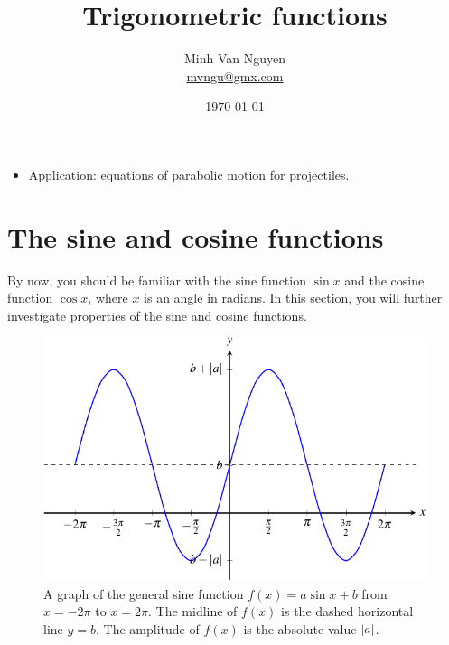 \documentclass[a4paper,oneside,12pt]{article}
\begin{document}
\title{\Large\bf Trigonometric functions}
\author{%
  Minh Van Nguyen \\
  \url{mvngu@gmx.com}
}
\date{\today}
\maketitle

\begin{itemize}
\item Application: equations of parabolic motion for projectiles.
\end{itemize}



\section{The sine and cosine functions}

By now, you should be familiar with the sine function $\sin x$ and the
cosine function $\cos x$, where $x$ is an angle in radians.  In this
section, you will further investigate properties of the sine and
cosine functions.

\begin{figure}[!htbp]
\centering
\includegraphics[scale=1.1]{image/13/a-sin-b.pdf}
\caption{%
  A graph of the general sine function
  $f(x) = a \sin x + b$ from $x = -2\pi$ to $x = 2\pi$.  The midline
  of $f(x)$ is the dashed horizontal line $y = b$.  The amplitude of
  $f(x)$ is the absolute value $\lvert a\rvert$.
}
\label{fig:trigonometric:general_sine}
\end{figure}
\end{document}
